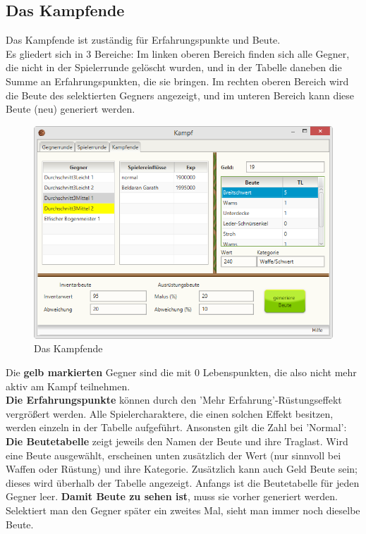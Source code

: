 \documentclass[11pt, a4paper, german]{article}
\begin{document}
\subsection{Das Kampfende}\label{Abschnitt:Kampfende}
Das Kampfende ist zuständig für Erfahrungspunkte und Beute.\\
Es gliedert sich in 3 Bereiche: Im linken oberen Bereich finden sich alle Gegner, die nicht in der Spielerrunde gelöscht wurden, und in der Tabelle daneben die Summe an Erfahrungspunkten, die sie bringen. Im rechten oberen Bereich wird die Beute des selektierten Gegners angezeigt, und im unteren Bereich kann diese Beute (neu) generiert werden.\\
\begin{figure}
\centering
\includegraphics[width=\linewidth]{Bilder/Kampfende.png}
\caption{Das Kampfende}
\label{Bild:Kampfende}
\end{figure}
Die \textbf{gelb markierten} Gegner sind die mit 0 Lebenspunkten, die also nicht mehr aktiv am Kampf teilnehmen.\\

\textbf{Die Erfahrungspunkte} können durch den 'Mehr Erfahrung'-Rüstungseffekt vergrößert werden. Alle Spielercharaktere, die einen solchen Effekt besitzen, werden einzeln in der Tabelle aufgeführt. Ansonsten gilt die Zahl bei 'Normal':\\

\textbf{Die Beutetabelle} zeigt jeweils den Namen der Beute und ihre Traglast. Wird eine Beute ausgewählt, erscheinen unten zusätzlich der Wert (nur sinnvoll bei Waffen oder Rüstung) und ihre Kategorie. Zusätzlich kann auch Geld Beute sein; dieses wird überhalb der Tabelle angezeigt. Anfangs ist die Beutetabelle für jeden Gegner leer. \textbf{Damit Beute zu sehen ist}, muss sie vorher generiert werden. Selektiert man den Gegner später ein zweites Mal, sieht man immer noch dieselbe Beute.
\end{document}
